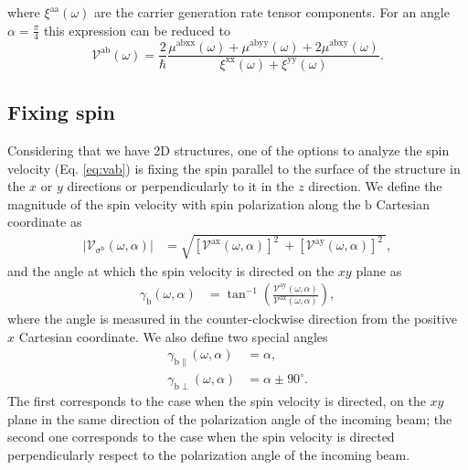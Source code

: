 \documentclass[prb,11pt,tightenlines,twocolumn,aps]{revtex4-1}
\begin{document}
{\color{red}
where $\xi^{\mathrm{aa}}(\omega)$ are the carrier generation rate tensor
components\cite{arzatePRB14}.
}
% 
For an angle $\alpha = \frac{\pi}{4}$ this expression can be reduced to 
\begin{equation*}\label{eq:vab-90deg}
\mathcal{V}^{\mathrm{ab}} (\omega)
= \frac{2}{\hbar}
\frac{\mu^{\mathrm{abxx}}(\omega) + \mu^{\mathrm{abyy}}(\omega) + 
2\mu^{\mathrm{abxy}}(\omega)}
{\xi^{\mathrm{xx}}(\omega) + \xi^{\mathrm{yy}}(\omega)}.
\end{equation*}



\subsection{Fixing spin}\label{sec:theory-fixspin}

{\color{red} Considering that we have 2D structures, one of the options to
analyze the spin velocity (Eq. \eqref{eq:vab}) is fixing the spin parallel to
the surface of the structure in the $x$ or $y$ directions or perpendicularly to
it in the $z$ direction. We define the magnitude of the spin velocity with spin
polarization along the $\mathrm{b}$ Cartesian coordinate as}
\begin{align}
|\mathcal{V}_{\sigma^{\mathrm{b}}}(\omega,\alpha)| 
&=
\sqrt{
[\mathcal{V}^{\mathrm{ax}}(\omega,\alpha)]^{2}\ +
[\mathcal{V}^{\mathrm{ay}}(\omega,\alpha)]^{2}\ 
}, 
\label{eq:vs-mag}
\end{align}
and the angle at which the spin velocity is directed on the $xy$ plane as
\begin{align}
\gamma_{\mathrm{b}} (\omega,\alpha)
&=
\tan^{-1} \left( \frac{\mathcal{V}^{\mathrm{ay}}(\omega,\alpha)}
{\mathcal{V}^{\mathrm{ax}}(\omega,\alpha)} \right),
\label{eq:gamma-ang}
\end{align}
where the angle is measured in the counter-clockwise direction from the
positive $x$ Cartesian coordinate. {\color{red} We also define two special
angles
\begin{align}
\gamma_{\mathrm{b \parallel}}(\omega,\alpha) &= \alpha, 
\label{eq:gamma-par} 
\\
\gamma_{\mathrm{b \perp}}(\omega,\alpha) &= \alpha \pm 90^{\circ}.
\label{eq:gamma-perp}
\end{align}
The first corresponds to the case when the spin velocity is directed, on the
$xy$ plane in the same direction of the polarization angle of the incoming
beam; the second one corresponds to the case when the spin velocity is directed
perpendicularly respect to the polarization angle of the incoming beam. }
\end{document}
